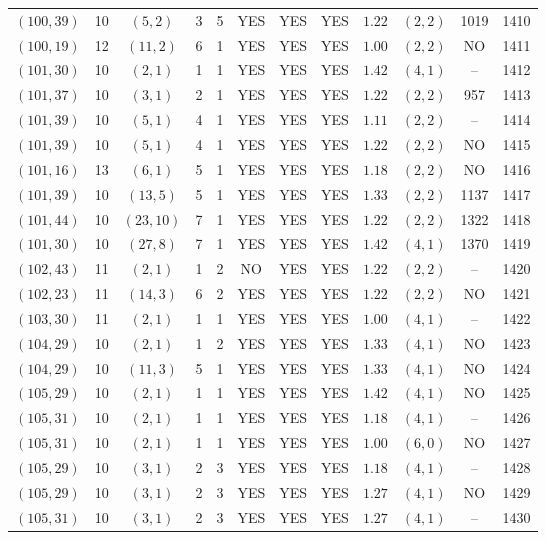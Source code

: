 \begin{longtable}{|c|c|c|c|c|c|c|c|c|c|c|c|}
$(100,39)$ & 10 & $(5,2)$ & 3 & 5 & YES & YES & YES & $1.22$ & $(2,2)$ & 1019 & 1410\\
$(100,19)$ & 12 & $(11,2)$ & 6 & 1 & YES & YES & YES & $1.00$ & $(2,2)$ & NO & 1411\\
$(101,30)$ & 10 & $(2,1)$ & 1 & 1 & YES & YES & YES & $1.42$ & $(4,1)$ & -- & 1412\\
$(101,37)$ & 10 & $(3,1)$ & 2 & 1 & YES & YES & YES & $1.22$ & $(2,2)$ & 957 & 1413\\
$(101,39)$ & 10 & $(5,1)$ & 4 & 1 & YES & YES & YES & $1.11$ & $(2,2)$ & -- & 1414\\
$(101,39)$ & 10 & $(5,1)$ & 4 & 1 & YES & YES & YES & $1.22$ & $(2,2)$ & NO & 1415\\
$(101,16)$ & 13 & $(6,1)$ & 5 & 1 & YES & YES & YES & $1.18$ & $(2,2)$ & NO & 1416\\
$(101,39)$ & 10 & $(13,5)$ & 5 & 1 & YES & YES & YES & $1.33$ & $(2,2)$ & 1137 & 1417\\
$(101,44)$ & 10 & $(23,10)$ & 7 & 1 & YES & YES & YES & $1.22$ & $(2,2)$ & 1322 & 1418\\
$(101,30)$ & 10 & $(27,8)$ & 7 & 1 & YES & YES & YES & $1.42$ & $(4,1)$ & 1370 & 1419\\
$(102,43)$ & 11 & $(2,1)$ & 1 & 2 & NO & YES & YES & $1.22$ & $(2,2)$ & -- & 1420\\
$(102,23)$ & 11 & $(14,3)$ & 6 & 2 & YES & YES & YES & $1.22$ & $(2,2)$ & NO & 1421\\
$(103,30)$ & 11 & $(2,1)$ & 1 & 1 & YES & YES & YES & $1.00$ & $(4,1)$ & -- & 1422\\
$(104,29)$ & 10 & $(2,1)$ & 1 & 2 & YES & YES & YES & $1.33$ & $(4,1)$ & NO & 1423\\
$(104,29)$ & 10 & $(11,3)$ & 5 & 1 & YES & YES & YES & $1.33$ & $(4,1)$ & NO & 1424\\
$(105,29)$ & 10 & $(2,1)$ & 1 & 1 & YES & YES & YES & $1.42$ & $(4,1)$ & NO & 1425\\
$(105,31)$ & 10 & $(2,1)$ & 1 & 1 & YES & YES & YES & $1.18$ & $(4,1)$ & -- & 1426\\
$(105,31)$ & 10 & $(2,1)$ & 1 & 1 & YES & YES & YES & $1.00$ & $(6,0)$ & NO & 1427\\
$(105,29)$ & 10 & $(3,1)$ & 2 & 3 & YES & YES & YES & $1.18$ & $(4,1)$ & -- & 1428\\
$(105,29)$ & 10 & $(3,1)$ & 2 & 3 & YES & YES & YES & $1.27$ & $(4,1)$ & NO & 1429\\
$(105,31)$ & 10 & $(3,1)$ & 2 & 3 & YES & YES & YES & $1.27$ & $(4,1)$ & -- & 1430\\

\end{longtable}
